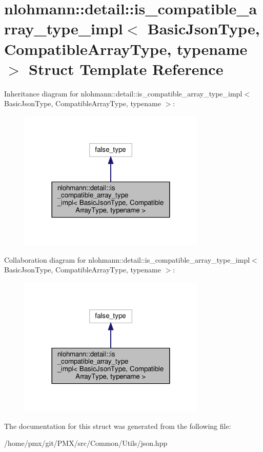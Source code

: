 \hypertarget{structnlohmann_1_1detail_1_1is__compatible__array__type__impl}{}\section{nlohmann\+:\+:detail\+:\+:is\+\_\+compatible\+\_\+array\+\_\+type\+\_\+impl$<$ Basic\+Json\+Type, Compatible\+Array\+Type, typename $>$ Struct Template Reference}
\label{structnlohmann_1_1detail_1_1is__compatible__array__type__impl}


Inheritance diagram for nlohmann\+:\+:detail\+:\+:is\+\_\+compatible\+\_\+array\+\_\+type\+\_\+impl$<$ Basic\+Json\+Type, Compatible\+Array\+Type, typename $>$\+:
\nopagebreak
\begin{figure}[H]
\begin{center}
\leavevmode
\includegraphics[width=252pt]{structnlohmann_1_1detail_1_1is__compatible__array__type__impl__inherit__graph}
\end{center}
\end{figure}


Collaboration diagram for nlohmann\+:\+:detail\+:\+:is\+\_\+compatible\+\_\+array\+\_\+type\+\_\+impl$<$ Basic\+Json\+Type, Compatible\+Array\+Type, typename $>$\+:
\nopagebreak
\begin{figure}[H]
\begin{center}
\leavevmode
\includegraphics[width=252pt]{structnlohmann_1_1detail_1_1is__compatible__array__type__impl__coll__graph}
\end{center}
\end{figure}


The documentation for this struct was generated from the following file\+:\begin{DoxyCompactItemize}
\item 
/home/pmx/git/\+P\+M\+X/src/\+Common/\+Utils/json.\+hpp\end{DoxyCompactItemize}
